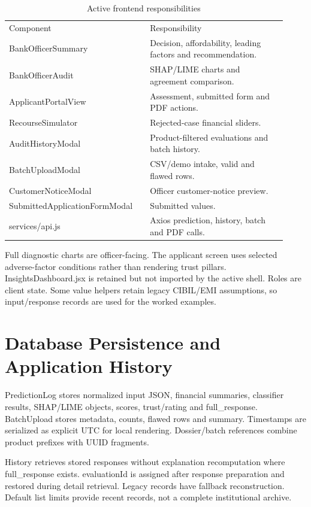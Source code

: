 \documentclass[12pt,a4paper]{report}
\begin{document}
\begin{longtable}{p{0.46\linewidth}p{0.46\linewidth}}
\caption{Active frontend responsibilities}\\

Component & Responsibility\\
BankOfficerSummary & Decision, affordability, leading factors and recommendation.\\
BankOfficerAudit & SHAP/LIME charts and agreement comparison.\\
ApplicantPortalView & Assessment, submitted form and PDF actions.\\
RecourseSimulator & Rejected-case financial sliders.\\
AuditHistoryModal & Product-filtered evaluations and batch history.\\
BatchUploadModal & CSV/demo intake, valid and flawed rows.\\
CustomerNoticeModal & Officer customer-notice preview.\\
SubmittedApplicationFormModal & Submitted values.\\
services/api.js & Axios prediction, history, batch and PDF calls.\\
\end{longtable}
Full diagnostic charts are officer-facing. The applicant screen uses selected adverse-factor conditions rather than rendering trust pillars. InsightsDashboard.jsx is retained but not imported by the active shell. Roles are client state. Some value helpers retain legacy CIBIL/EMI assumptions, so input/response records are used for the worked examples.

\section{Database Persistence and Application History}
PredictionLog stores normalized input JSON, financial summaries, classifier results, SHAP/LIME objects, scores, trust/rating and full\_response. BatchUpload stores metadata, counts, flawed rows and summary. Timestamps are serialized as explicit UTC for local rendering. Dossier/batch references combine product prefixes with UUID fragments.

History retrieves stored responses without explanation recomputation where full\_response exists. evaluationId is assigned after response preparation and restored during detail retrieval. Legacy records have fallback reconstruction. Default list limits provide recent records, not a complete institutional archive.
\end{document}
